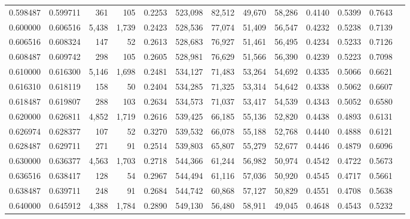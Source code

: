 \begin{tabular}{rrrrrrrrrrrrr}
0.598487 & 0.599711 &    361 &   105 &                                     0.2253 & 523,098 &  82,512 &  49,670 &  58,286 & 0.4140 & 0.5399 & 0.7643 \\
0.600000 & 0.606516 &  5,438 & 1,739 &                                     0.2423 & 528,536 &  77,074 &  51,409 &  56,547 & 0.4232 & 0.5238 & 0.7139 \\
0.606516 & 0.608324 &    147 &    52 &                                     0.2613 & 528,683 &  76,927 &  51,461 &  56,495 & 0.4234 & 0.5233 & 0.7126 \\
0.608487 & 0.609742 &    298 &   105 &                                     0.2605 & 528,981 &  76,629 &  51,566 &  56,390 & 0.4239 & 0.5223 & 0.7098 \\
0.610000 & 0.616300 &  5,146 & 1,698 &                                     0.2481 & 534,127 &  71,483 &  53,264 &  54,692 & 0.4335 & 0.5066 & 0.6621 \\
0.616310 & 0.618119 &    158 &    50 &                                     0.2404 & 534,285 &  71,325 &  53,314 &  54,642 & 0.4338 & 0.5062 & 0.6607 \\
0.618487 & 0.619807 &    288 &   103 &                                     0.2634 & 534,573 &  71,037 &  53,417 &  54,539 & 0.4343 & 0.5052 & 0.6580 \\
0.620000 & 0.626811 &  4,852 & 1,719 &                                     0.2616 & 539,425 &  66,185 &  55,136 &  52,820 & 0.4438 & 0.4893 & 0.6131 \\
0.626974 & 0.628377 &    107 &    52 &                                     0.3270 & 539,532 &  66,078 &  55,188 &  52,768 & 0.4440 & 0.4888 & 0.6121 \\
0.628487 & 0.629711 &    271 &    91 &                                     0.2514 & 539,803 &  65,807 &  55,279 &  52,677 & 0.4446 & 0.4879 & 0.6096 \\
0.630000 & 0.636377 &  4,563 & 1,703 &                                     0.2718 & 544,366 &  61,244 &  56,982 &  50,974 & 0.4542 & 0.4722 & 0.5673 \\
0.636516 & 0.638417 &    128 &    54 &                                     0.2967 & 544,494 &  61,116 &  57,036 &  50,920 & 0.4545 & 0.4717 & 0.5661 \\
0.638487 & 0.639711 &    248 &    91 &                                     0.2684 & 544,742 &  60,868 &  57,127 &  50,829 & 0.4551 & 0.4708 & 0.5638 \\
0.640000 & 0.645912 &  4,388 & 1,784 &                                     0.2890 & 549,130 &  56,480 &  58,911 &  49,045 & 0.4648 & 0.4543 & 0.5232 \\

\end{tabular}
